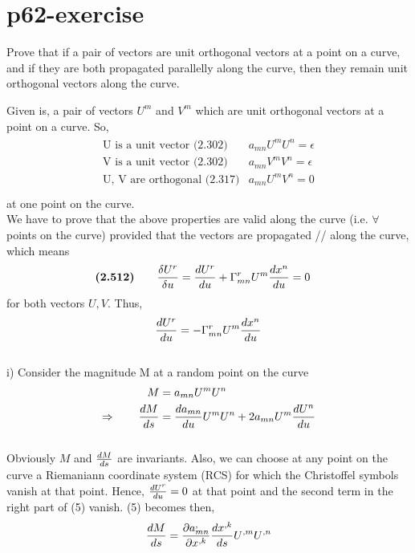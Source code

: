 \section{p62-exercise}
\begin{tcolorbox}
Prove that if a pair of vectors are unit orthogonal vectors at a point on a curve, and if they are both propagated parallelly along the curve, then they remain unit orthogonal vectors along the curve.
\end{tcolorbox}
Given is, a pair of vectors $U^m$ and $V^m$ which are unit orthogonal vectors at a point on a curve. So,
\begin{align}
\begin{array}{cc}
\text{U is a unit vector (2.302)}& a_{mn}U^m U^n = \epsilon\\
\text{V is a unit vector (2.302)}& a_{mn}V^m V^n = \epsilon\\
\text{U, V are orthogonal (2.317)}& a_{mn}U^m V^n = 0\\
\end{array}
\end{align}
at one point on the curve.\\
We have to prove that the above properties are valid along the curve (i.e. $\forall$ points on the curve) provided that the vectors are propagated // along the curve, which means
\begin{align}
\textbf{(2.512)}\quad\quad \frac{\delta U^r}{\delta u} &= \dv{U^r}{u} + \Gamma^r_{mn}U^m \dv{x^n}{u} = 0
\end{align}
for both vectors $U, V$. Thus,
\begin{align}
\dv{U^r}{u} = - \Gamma^r_{mn}U^m \dv{x^n}{u}
\end{align}\\
i) Consider the magnitude M at a random point on the curve
\begin{align}
\ M &= a_{mn}U^m U^n \\
\Rightarrow \quad\quad \dv{M}{s} &= \dv{a_{mn}}{u}U^m U^n + 2a_{mn}U^m \dv{U^n}{u} 
\end{align}\\
Obviously $M$ and $\dv{M}{s}$ are invariants. Also, we can choose at any point on the curve a Riemaniann coordinate system (RCS) for which the Christoffel symbols vanish at that point. Hence, $\dv{U^r}{u} = 0 $ at that point and the second term in the right part of (5) vanish. (5) becomes then,
\begin{align}
 \dv{M}{s} = \pdv{a^,_{mn}}{x^{,k}}\dv{x^{,k}}{s}U^{,m} U^{,n}  
\end{align}
